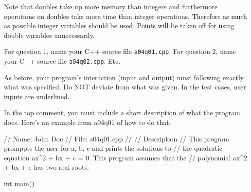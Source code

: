Note that doubles take up more memory than integers and furthermore 
operations on doubles take
more time than integer operations. 
Therefore as much as possible integer variables should be used.
Points will be taken off for using double variables unnecessarily.

For question 1, name your C++ source file \texttt{a04q01.cpp}.
For question 2, name your C++ source file \texttt{a04q02.cpp}.
Etc.
 
As before, your program's interaction (input and output) must following 
exactly what was specified. 
Do
NOT deviate from what was given.
In the test cases, user inputs are underlined.

In the top comment, you must include a short description of what the program 
does. 
Here's an example from a04q01 of how to do that:

\begin{console}
// Name: John Doe
// File: a04q01.cpp
//
// Description
// This program promppts the user for a, b, c and prints the solutions to
// the quadratic equation ax^2 + bx + c = 0. This program assumes that the
// polynomial ax^2 + bx + c has two real roots.

int main()
\end{console}

